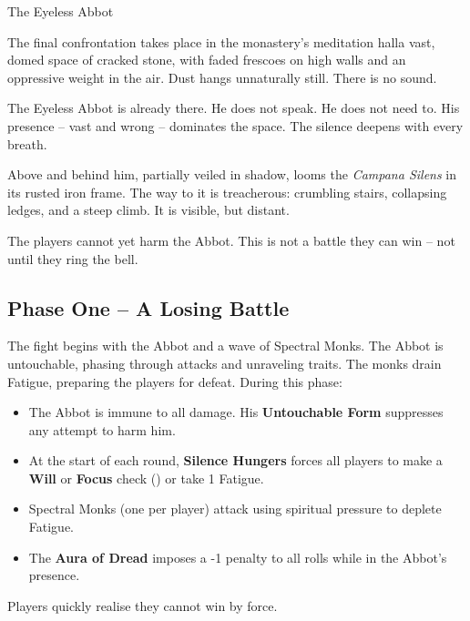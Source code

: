 \documentclass[twocolumn,nodeprecatedcode,bg=print]{dndbook/dndbook}
\begin{document}
\begin{WyrdFullNPC}[%
    name=The Eyeless Abbot,%
    description=Silence Incarnate,%
    float=!t%
]{The Eyeless Abbot}
    \DamageBox[%
        totalfatigue=3,%
        totalmild=2,%
        totalmoderate=1,%
        totalsevere=0,%
    ]

\end{WyrdFullNPC}


The final confrontation takes place in the monastery's meditation hall\textemdash{}a vast, domed space of cracked stone, with faded frescoes on high walls and an oppressive weight in the air. Dust hangs unnaturally still. There is no sound.

The Eyeless Abbot is already there. He does not speak. He does not need to. His presence – vast and wrong – dominates the space. The silence deepens with every breath.

Above and behind him, partially veiled in shadow, looms the \emph{Campana Silens} in its rusted iron frame. The way to it is treacherous: crumbling stairs, collapsing ledges, and a steep climb. It is visible, but distant.

The players cannot yet harm the Abbot. This is not a battle they can win – not until they ring the bell.

\subsection*{Phase One – A Losing Battle}

The fight begins with the Abbot and a wave of Spectral Monks. The Abbot is untouchable, phasing through attacks and unraveling traits. The monks drain Fatigue, preparing the players for defeat. During this phase:

\begin{WyrdExample}
    \begin{itemize}
    \item The Abbot is immune to all damage. His \textbf{Untouchable Form} suppresses any attempt to harm him.
    \item At the start of each round, \textbf{Silence Hungers} forces all players to make a \textbf{Will} or \textbf{Focus} check (\Difficult) or take 1 Fatigue.
    \item Spectral Monks (one per player) attack using spiritual pressure to deplete Fatigue.
    \item The \textbf{Aura of Dread} imposes a -1 penalty to all rolls while in the Abbot's presence.
    \end{itemize}
\end{WyrdExample}

\noindent
Players quickly realise they cannot win by force.
\end{document}

